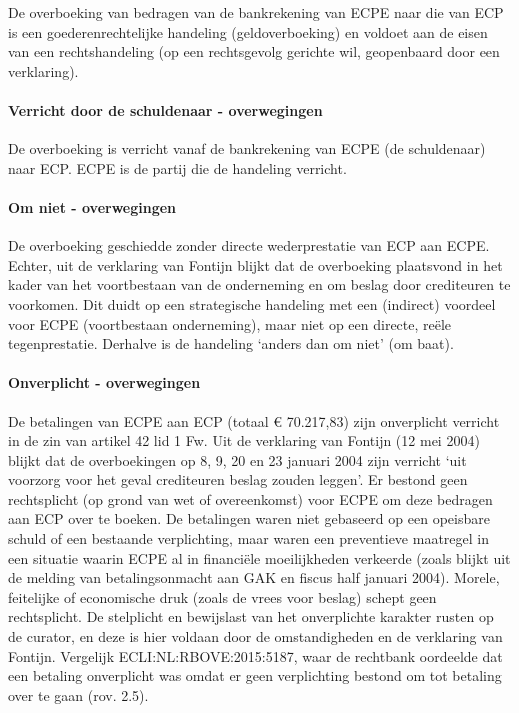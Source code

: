 \documentclass[
  dutch,
  a4paper,
]{article}
\begin{document}
De overboeking van bedragen van de bankrekening van ECPE naar die van ECP is een goederenrechtelijke handeling (geldoverboeking) en voldoet aan de eisen van een rechtshandeling (op een rechtsgevolg gerichte wil, geopenbaard door een verklaring).

\paragraph{Verricht door de schuldenaar - overwegingen}\label{verricht-door-de-schuldenaar---overwegingen-48}

De overboeking is verricht vanaf de bankrekening van ECPE (de schuldenaar) naar ECP. ECPE is de partij die de handeling verricht.

\paragraph{Om niet - overwegingen}\label{om-niet---overwegingen-48}

De overboeking geschiedde zonder directe wederprestatie van ECP aan ECPE. Echter, uit de verklaring van Fontijn blijkt dat de overboeking plaatsvond in het kader van het voortbestaan van de onderneming en om beslag door crediteuren te voorkomen. Dit duidt op een strategische handeling met een (indirect) voordeel voor ECPE (voortbestaan onderneming), maar niet op een directe, reële tegenprestatie. Derhalve is de handeling `anders dan om niet' (om baat).

\paragraph{Onverplicht - overwegingen}\label{onverplicht---overwegingen-48}

De betalingen van ECPE aan ECP (totaal € 70.217,83) zijn onverplicht verricht in de zin van artikel 42 lid 1 Fw. Uit de verklaring van Fontijn (12 mei 2004) blijkt dat de overboekingen op 8, 9, 20 en 23 januari 2004 zijn verricht `uit voorzorg voor het geval crediteuren beslag zouden leggen'. Er bestond geen rechtsplicht (op grond van wet of overeenkomst) voor ECPE om deze bedragen aan ECP over te boeken. De betalingen waren niet gebaseerd op een opeisbare schuld of een bestaande verplichting, maar waren een preventieve maatregel in een situatie waarin ECPE al in financiële moeilijkheden verkeerde (zoals blijkt uit de melding van betalingsonmacht aan GAK en fiscus half januari 2004). Morele, feitelijke of economische druk (zoals de vrees voor beslag) schept geen rechtsplicht. De stelplicht en bewijslast van het onverplichte karakter rusten op de curator, en deze is hier voldaan door de omstandigheden en de verklaring van Fontijn. Vergelijk ECLI:NL:RBOVE:2015:5187, waar de rechtbank oordeelde dat een betaling onverplicht was omdat er geen verplichting bestond om tot betaling over te gaan (rov. 2.5).
\end{document}
